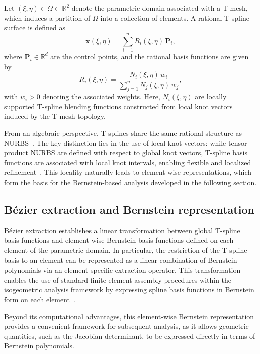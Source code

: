 \documentclass{jssc}
\begin{document}
Let $(\xi,\eta) \in \Omega \subset \mathbb{R}^2$ denote the parametric domain associated with a T-mesh, which induces a partition of $\Omega$ into a collection of elements. A rational T-spline surface is defined as
\begin{equation}
\bm{x}(\xi,\eta)
=
\sum_{i=1}^{n}
R_i(\xi,\eta)\,\mathbf{P}_i,
\label{eq:rational_t_spline_surface}
\end{equation}
where $\mathbf{P}_i \in \mathbb{R}^d$ are the control points, and the rational basis functions are given by
\begin{equation}
R_i(\xi,\eta)
=
\frac{N_i(\xi,\eta)\, w_i}
{\displaystyle \sum_{j=1}^{n} N_j(\xi,\eta)\, w_j},
\label{eq:rational_t_spline_basis}
\end{equation}
with $w_i > 0$ denoting the associated weights. Here, $N_i(\xi,\eta)$ are locally supported T-spline blending functions constructed from local knot vectors induced by the T-mesh topology.

From an algebraic perspective, T-splines share the same rational structure as NURBS~\citep{sederberg2004tspline}. The key distinction lies in the use of local knot vectors: while tensor-product NURBS are defined with respect to global knot vectors, T-spline basis functions are associated with local knot intervals, enabling flexible and localized refinement~\citep{sederberg2008watertight}. This locality naturally leads to element-wise representations, which form the basis for the Bernstein-based analysis developed in the following section.

\subsection{B\'ezier extraction and Bernstein representation}
\label{sec:bezier_extraction}

B\'ezier extraction establishes a linear transformation between global T-spline basis functions and element-wise Bernstein basis functions defined on each element of the parametric domain. In particular, the restriction of the T-spline basis to an element can be represented as a linear combination of Bernstein polynomials via an element-specific extraction operator. This transformation enables the use of standard finite element assembly procedures within the isogeometric analysis framework by expressing spline basis functions in Bernstein form on each element~\citep{borden2011isogeometric,scott2011isogeometric}.

Beyond its computational advantages, this element-wise Bernstein representation provides a convenient framework for subsequent analysis, as it allows geometric quantities, such as the Jacobian determinant, to be expressed directly in terms of Bernstein polynomials.
\end{document}
